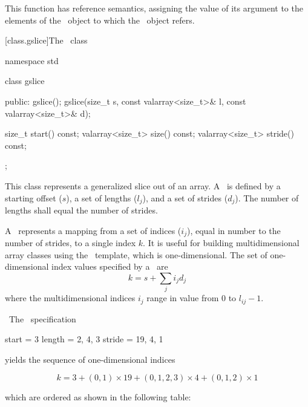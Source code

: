 \documentclass[american,twoside]{book}
\begin{document}
\begin{paras}
\begin{itemdescr}
\pnum
This function has reference semantics, assigning the value of its argument
to the elements of the
\
object to which the
\
object refers.
\end{itemdescr}

[class.gslice]{The \ class}

%
\begin{codeblock}
namespace std {
  class gslice {
  public:
    gslice();
    gslice(size_t s, const valarray<size_t>& l, const valarray<size_t>& d);

    size_t           start() const;
    valarray<size_t> size() const;
    valarray<size_t> stride() const;
  };
}
\end{codeblock}

\pnum
This class represents a generalized slice out of an array.
A
\
is defined by a starting offset ($s$),
a set of lengths ($l_j$),
and a set of strides ($d_j$).
The number of lengths shall equal the number of strides.

\pnum
A
\
represents a mapping from a set of indices ($i_j$),
equal in number to the number of strides, to a single index $k$.
It is useful for building multidimensional array classes using
the
\tcode{valarray}\
template, which is one-dimensional.
The set of one-dimensional index values specified by a
\
are $$k = s + \sum_ji_jd_j$$
where the multidimensional indices $i_j$ range in value from
0 to $l_{ij} - 1$.

\pnum
\enterexample\ 
The
\tcode{gslice}\
specification
\begin{codeblock}
start  = 3
length = {2, 4, 3}
stride = {19, 4, 1}

\end{codeblock}
yields the sequence of one-dimensional indices

$$k = 3 + (0,1) \times 19 + (0,1,2,3) \times 4 + (0,1,2) \times 1$$

which are ordered as shown in the following table:


\end{paras}
\end{document}

